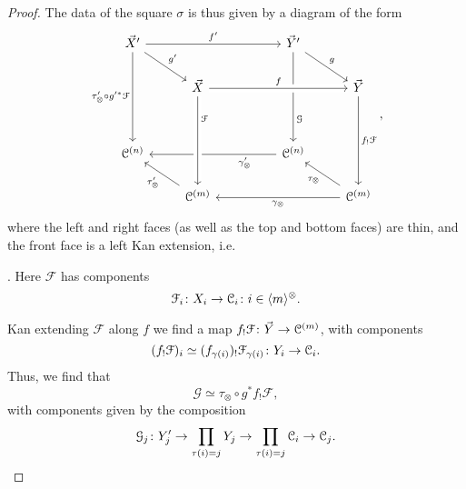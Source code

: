 \documentclass[main.tex]{subfiles}
\begin{document}
\begin{proof}
  The data of the square $\sigma$ is thus given by a diagram of the form
  \begin{equation*}
    \begin{tikzcd}
      \vec{X}'
      \arrow[rrr, "f'"]
      \arrow[dr, "g'"]
      \arrow[ddd, swap, "\tau'_{\otimes} \circ g'^{*}\mathcal{F}"]
      &&& \vec{Y}'
      \arrow[ddd, near end, "\mathcal{G}"]
      \arrow[dr, "g"]
      \\
      & \vec{X}
      \arrow[rrr, crossing over, "f"]
      &&& \vec{Y}
      \arrow[ddd, "f_{!}\mathcal{F}"]
      \\
      \\
      \category{C}^{(n)}
      &&& \category{C}^{(n)}
      \arrow[lll, near start, "\gamma'_{\otimes}"]
      \\
      & \category{C}^{(m)}
      \arrow[ul, "\tau'_{\otimes}"]
      \arrow[from=uuu, crossing over, near start, "\mathcal{F}"]
      &&& \category{C}^{(m)}
      \arrow[lll, "\gamma_{\otimes}"]
      \arrow[ul, "\tau_{\otimes}"]
    \end{tikzcd},
  \end{equation*}
  where the left and right faces (as well as the top and bottom faces) are thin, and the front face is a left Kan extension, i.e.\

  . Here $\mathcal{F}$ has components
  \begin{equation*}
    \mathcal{F}_{i}\colon X_{i} \to \mathcal{C}_{i}\colon i \in \langle m \rangle^{\otimes}.
  \end{equation*}

  Kan extending $\mathcal{F}$ along $f$ we find a map $f_{!}\mathcal{F}\colon \vec{Y} \to \mathcal{C}^{(m)}$, with components
  \begin{equation*}
    (f_{!}\mathcal{F})_{i} \simeq (f_{\gamma(i)})_{!}\mathcal{F}_{\gamma(i)}\colon Y_{i} \to \mathcal{C}_{i}.
  \end{equation*}
  Thus, we find that
  \begin{equation*}
    \mathcal{G} \simeq \tau_{\otimes} \circ g^{*}f_{!}\mathcal{F},
  \end{equation*}
  with components given by the composition
  \begin{equation*}
    \mathcal{G}_{j}\colon Y'_{j} \to \prod_{\tau(i) = j} Y_{j} \to \prod_{\tau(i) = j} \mathcal{C}_{i} \to \mathcal{C}_{j}.
  \end{equation*}


\end{proof}
\end{document}
